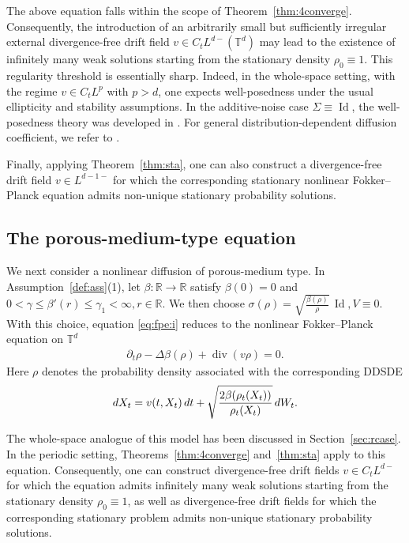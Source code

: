 \documentclass[10pt,a4paper]{amsart}
\numberwithin{equation}{section}
\def\dif{{\mathord{{\rm d}}}}
\def\leq{\leqslant}
\def\dif{{\mathord{{\rm d}}}}
\def\leq{\leqslant}
\begin{document}
The above equation falls within the scope of
Theorem~\ref{thm:4converge}. Consequently, the introduction of an arbitrarily
small but sufficiently irregular external divergence-free drift field
$v\in C_tL^{d-}(\mathbb{T}^d)$ may lead to the existence of infinitely many
weak solutions starting from the stationary density $\rho_0\equiv 1$.
This regularity threshold is essentially sharp. Indeed, in the whole-space setting, with the regime
$v\in C_tL^p$ with $p>d$, one expects well-posedness under the usual
ellipticity and stability assumptions. In the additive-noise case
$\Sigma\equiv \operatorname{Id}$, the well-posedness theory   was developed in \cite[Theorem~4.3]{RZ21}. For general
distribution-dependent diffusion coefficient, we refer to  \cite[Theorem~4.1]{Zha25}.

Finally, applying Theorem~\ref{thm:sta}, one can also construct a divergence-free drift field
$
v\in L^{d-1-} 
$
for which the corresponding stationary nonlinear Fokker--Planck equation
admits non-unique stationary probability solutions.
 
\subsection{The porous-medium-type equation}

We next consider a nonlinear diffusion of porous-medium type. In   Assumption~\ref{def:ass}\textnormal{(1)}, let
$\beta:\mathbb{R}\to\mathbb{R}$ satisfy $\beta(0)=0$ and
$
0<\gamma\leq \beta'(r)\leq \gamma_1<\infty,
r\in\mathbb{R}.
$ We then choose
$
\sigma(\rho)
=
\sqrt{\frac{\beta(\rho)}{\rho}}\,\operatorname{Id},
V\equiv 0 .$
With this choice, equation \eqref{eq:fpe:i} reduces to the nonlinear
Fokker--Planck equation on $\mathbb{T}^d$
\begin{align*}
\partial_t\rho
-
\Delta\beta(\rho)
+
\operatorname{div}(v\rho)
=
0 .
\end{align*}
Here $\rho$ denotes the probability density associated with the corresponding
DDSDE
\begin{align*}
\dif X_t
=
v(t,X_t)\,\dif t
+
\sqrt{\frac{2\beta(\rho_t(X_t))}{\rho_t(X_t)}}\,\dif W_t .
\end{align*} 

The whole-space analogue of this model has been discussed in
Section~\ref{sec:rcase}. In the periodic setting, Theorems~\ref{thm:4converge}
and~\ref{thm:sta} apply to this equation. Consequently, one can construct
divergence-free drift fields $v\in C_tL^{d-}$ for which the equation admits infinitely many
weak solutions starting from the stationary density $\rho_0\equiv 1$, as well
as divergence-free drift fields for which the corresponding stationary problem
admits non-unique stationary probability solutions.
\end{document}

